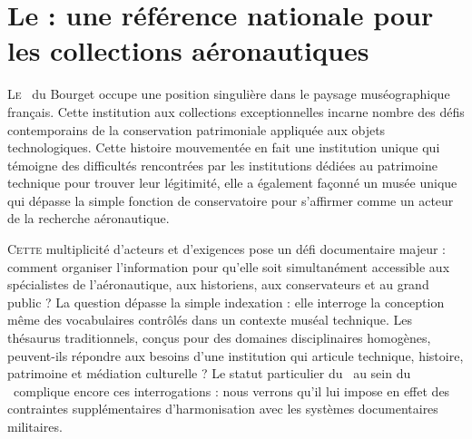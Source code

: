 \chapter[Une référence nationale]{\label{I-A}Le \mae : une référence nationale pour les collections aéronautiques}

\lettrine{L}e \maelong~du Bourget occupe une position singulière dans le paysage muséographique français. Cette institution aux collections exceptionnelles incarne nombre des défis contemporains de la conservation patrimoniale appliquée aux objets technologiques. Cette histoire mouvementée en fait une institution unique qui témoigne des difficultés rencontrées par les institutions dédiées au patrimoine technique pour trouver leur légitimité, elle a également façonné un musée unique qui dépasse la simple fonction de conservatoire pour s'affirmer comme un acteur de la recherche aéronautique.






\bigskip
\bigskip
\bigskip

\lettrine{C}{ette} multiplicité d'acteurs et d'exigences pose un défi documentaire majeur : comment organiser l'information pour qu'elle soit simultanément accessible aux spécialistes de l'aéronautique, aux historiens, aux conservateurs et au grand public ? La question dépasse la simple indexation : elle interroge la conception même des vocabulaires contrôlés dans un contexte muséal technique. Les thésaurus traditionnels, conçus pour des domaines disciplinaires homogènes, peuvent-ils répondre aux besoins d'une institution qui articule technique, histoire, patrimoine et médiation culturelle ?
Le statut particulier du \mae~au sein du \minarm~complique encore ces interrogations : nous verrons qu'il lui impose en effet des contraintes supplémentaires d'harmonisation avec les systèmes documentaires militaires.